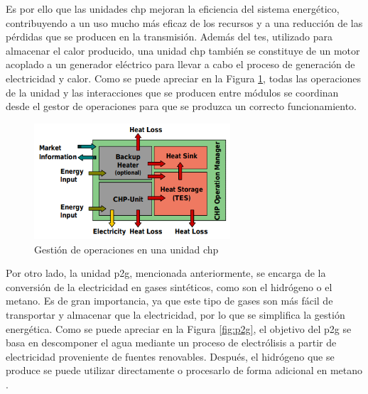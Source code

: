 Es por ello que las unidades \gls{chp} mejoran la eficiencia del sistema energético, contribuyendo a un uso mucho más eficaz de los recursos y a una reducción de las pérdidas que se producen en la transmisión. Además del \gls{tes}, utilizado para almacenar el calor producido, una unidad \gls{chp} también se constituye de un motor acoplado a un generador eléctrico para llevar a cabo el proceso de generación de electricidad y calor. Como se puede apreciar en la Figura \ref{fig:chp2}, todas las operaciones de la unidad y las interacciones que se producen entre módulos se coordinan desde el gestor de operaciones para que se produzca un correcto funcionamiento.

\vspace{3mm}

\begin{figure}[h!]
  \centering
  \includegraphics[width=0.65\textwidth]{img/teoria/chp2.png}
  \caption{Gestión de operaciones en una unidad \acrshort{chp} \cite{chp2}}
  \label{fig:chp2}
\end{figure}

\vspace{3mm}
\pagebreak

Por otro lado, la unidad \gls{p2g}, mencionada anteriormente, se encarga de la conversión de la electricidad en gases sintéticos, como son el hidrógeno o el metano. Es de gran importancia, ya que este tipo de gases son más fácil de transportar y almacenar que la electricidad, por lo que se simplifica la gestión energética. Como se puede apreciar en la Figura \ref{fig:p2g}, el objetivo del \gls{p2g} se basa en descomponer el agua mediante un proceso de electrólisis a partir de electricidad proveniente de fuentes renovables. Después, el hidrógeno que se produce se puede utilizar directamente o procesarlo de forma adicional en metano \cite{transactive}. 

\vspace{3mm}


